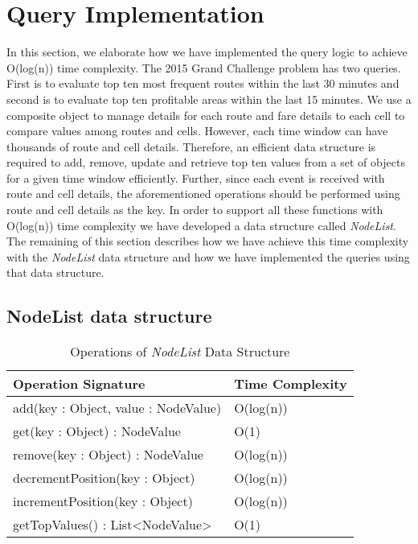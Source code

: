 \section{Query Implementation}
In this section, we elaborate how we have implemented the query logic to achieve O(log(n)) time complexity. The 2015 Grand Challenge problem has two queries. First is to evaluate top ten most frequent routes within the last 30 minutes and second is to evaluate top ten profitable areas within the last 15 minutes. We use a composite object to manage details for each route and fare details to each cell to compare values among routes and cells. However, each time window can have thousands of route and cell details. Therefore, an efficient data structure is required to add, remove, update and retrieve top ten values from a set of objects for a given time window efficiently. Further, since each event is received with route and cell details, the aforementioned operations should be performed using route and cell details as the key. In order to support all these functions with O(log(n)) time complexity we have developed a data structure called \textit{NodeList}. The remaining of this section describes how we have achieve this time complexity with the \textit{NodeList} data structure and how we have implemented the queries using that data structure.

\subsection{NodeList data structure}

\begin{table}
\centering
\caption{Operations of \textit{NodeList} Data Structure}
\begin{tabular}{|l|l|} \hline
Operation Signature & Time Complexity \\ \hline \hline
add(key : Object, value : NodeValue) & O(log(n)) \\ \hline 
get(key : Object) : NodeValue & O(1) \\ \hline
remove(key : Object) : NodeValue & O(log(n)) \\ \hline
decrementPosition(key : Object) & O(log(n)) \\ \hline
incrementPosition(key : Object) & O(log(n)) \\ \hline
getTopValues() : List<NodeValue> & O(1) \\ \hline
\end{tabular}
\label{nodelist_api}
\end{table}

